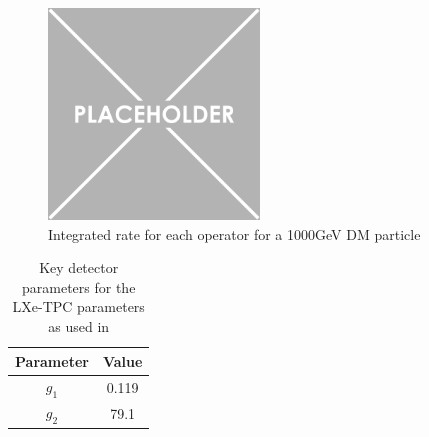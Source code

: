\begin{figure}
    \centering
    \includegraphics[width=0.5\textwidth]{Figures/Placeholder.png}
    \caption{Integrated rate for each operator for a 1000GeV DM particle}
    \label{fig:operator_integrated_rate}
\end{figure}

\begin{table}[]
    \centering
    \begin{tabular}{c|c}
        Parameter   & Value  \\ \hline
        $g_{1}$     & 0.119 \\
        $g_{2}$     & 79.1  
    \end{tabular}
    \caption{Key detector parameters for the LXe-TPC parameters as used in \cite{LZ_projected_sensitivity_paper_ref}}
    \label{tab:projected_sensitivity_detector_parameters}
\end{table}

\fi
